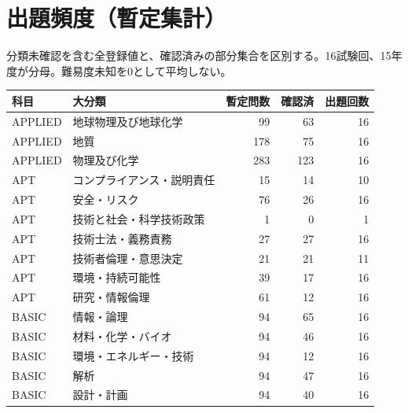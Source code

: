 \chapter{出題頻度（暫定集計）}
分類未確認を含む全登録値と、確認済みの部分集合を区別する。16試験回、15年度が分母。難易度未知を0として平均しない。
\begin{longtable}{p{.16\linewidth}p{.42\linewidth}rrr}
科目 & 大分類 & 暫定問数 & 確認済 & 出題回数\\\hline
APPLIED & 地球物理及び地球化学 & 99 & 63 & 16\\
APPLIED & 地質 & 178 & 75 & 16\\
APPLIED & 物理及び化学 & 283 & 123 & 16\\
APT & コンプライアンス・説明責任 & 15 & 14 & 10\\
APT & 安全・リスク & 76 & 26 & 16\\
APT & 技術と社会・科学技術政策 & 1 & 0 & 1\\
APT & 技術士法・義務責務 & 27 & 27 & 16\\
APT & 技術者倫理・意思決定 & 21 & 21 & 11\\
APT & 環境・持続可能性 & 39 & 17 & 16\\
APT & 研究・情報倫理 & 61 & 12 & 16\\
BASIC & 情報・論理 & 94 & 65 & 16\\
BASIC & 材料・化学・バイオ & 94 & 46 & 16\\
BASIC & 環境・エネルギー・技術 & 94 & 12 & 16\\
BASIC & 解析 & 94 & 47 & 16\\
BASIC & 設計・計画 & 94 & 40 & 16\\
\end{longtable}
